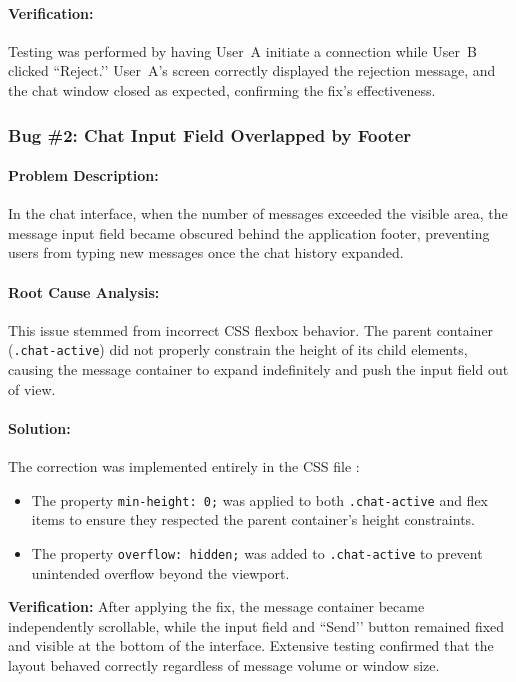 \paragraph{Verification:}  
Testing was performed by having User~A initiate a connection while User~B clicked ``Reject.’’ 
User~A’s screen correctly displayed the rejection message, and the chat window closed as expected, confirming the fix’s effectiveness.

\subsubsection{Bug \#2: Chat Input Field Overlapped by Footer}

\paragraph{Problem Description:}
In the chat interface, when the number of messages exceeded the visible area, 
the message input field became obscured behind the application footer, 
preventing users from typing new messages once the chat history expanded.

\paragraph{Root Cause Analysis:}
This issue stemmed from incorrect CSS flexbox behavior. 
The parent container (\texttt{.chat-active}) did not properly constrain the height of its child elements, 
causing the message container to expand indefinitely and push the input field out of view.

\paragraph{Solution:}
The correction was implemented entirely in the CSS file \texttt{}:
\begin{itemize}
    \item The property \texttt{min-height: 0;} was applied to both \texttt{.chat-active} and \texttt{} flex items to ensure they respected the parent container’s height constraints.
    \item The property \texttt{overflow: hidden;} was added to \texttt{.chat-active} to prevent unintended overflow beyond the viewport.
\end{itemize}

\noindent\textbf{Verification:}  
After applying the fix, the message container became independently scrollable, while the input field and ``Send’’ button remained fixed and visible at the bottom of the interface. 
Extensive testing confirmed that the layout behaved correctly regardless of message volume or window size.

